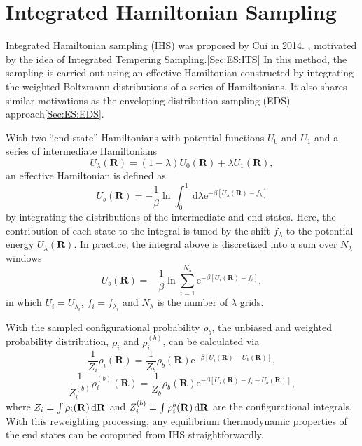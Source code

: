 \section{Integrated Hamiltonian Sampling\label{Sec:ES:IHS}}
Integrated Hamiltonian sampling (IHS) was proposed by Cui in 2014.\cite{MoriJPCB2014} , motivated by the idea of Integrated Tempering Sampling.\ref{Sec:ES:ITS} In this method, the sampling is carried out using an effective Hamiltonian constructed by integrating the weighted Boltzmann distributions of a series of Hamiltonians. It also shares similar motivations as the enveloping distribution sampling (EDS) approach\ref{Sec:ES:EDS}.

With two ``end-state'' Hamiltonians with potential functions $U_0$ and $U_1$ and a series of intermediate Hamiltonians
\begin{equation}
	U_{\lambda}(\mathbf{R})=(1-\lambda)U_0(\mathbf{R})+\lambda U_1(\mathbf{R}),
\end{equation}
an effective Hamiltonian is defined as
\begin{equation}
    U_b(\mathbf{R})=-\frac{1}{\beta} \ln \int_0^1 \mathrm{~d} \lambda \mathrm{e}^{-\beta \left[U_\lambda(\mathbf{R})-f_\lambda\right]}
\end{equation}
by integrating the distributions of the intermediate and end states. 
Here, the contribution of each state to the integral is tuned by the shift $f_\lambda$ to the potential energy $U_\lambda(\mathbf{R})$. 
In practice, the integral above is discretized into a sum over
$N_{\lambda}$ windows
\begin{equation}
	U_b(\mathbf{R})=-\frac{1}{\beta} \ln \sum_{i=1}^{N_\lambda} \mathrm{e}^{-\beta \left[U_i(\mathbf{R})-f_i\right]},
\end{equation}
in which $U_i=U_{\lambda_i}$, 
$f_i=f_{\lambda_i}$
and $N_\lambda$ is the number of $\lambda$ grids. 

With the sampled configurational probability $\rho_b$, the unbiased and weighted probability distribution, $\rho_i$  and $\rho_i^{(b)}$, can be calculated via
\begin{equation}
	\frac{1}{Z_i} \rho_i(\mathbf{R})=\frac{1}{Z_b} \rho_b(\mathbf{R}) \mathrm{e}^{-\beta\left[U_i(\mathbf{R})-U_b(\mathbf{R})\right]},
\end{equation}
\begin{equation}
	\frac{1}{Z_i^{(b)}} \rho_i^{(b)}(\mathbf{R})=\frac{1}{Z_b} \rho_b(\mathbf{R}) \mathrm{e}^{-\beta\left[U_i(\mathbf{R})-f_i-U_b(\mathbf{R})\right]},
\end{equation}
where $Z_i=\int \rho_i(\mathbf{R})\mathop{}\!\mathrm{d} \mathbf{R}$ and $Z_i^{(b)}=\int \rho_i^{b}(\mathbf{R})\mathop{}\!\mathrm{d} \mathbf{R}$ are the configurational integrals. With this reweighting processing, any equilibrium thermodynamic properties of the end states can be computed from IHS straightforwardly.

